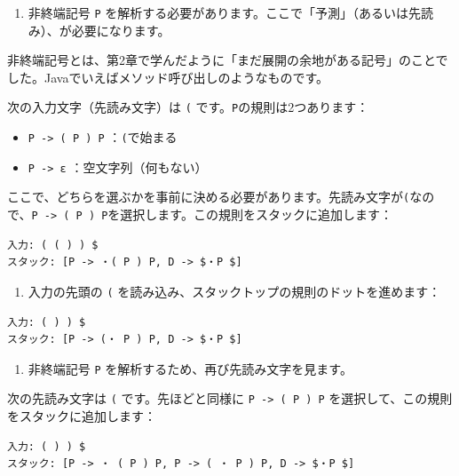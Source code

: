 \begin{enumerate}
\def\labelenumi{\arabic{enumi}.}
\setcounter{enumi}{1}
\tightlist
\item
  非終端記号 \texttt{P}
  を解析する必要があります。ここで「予測」（あるいは先読み）、が必要になります。
\end{enumerate}

非終端記号とは、第2章で学んだように「まだ展開の余地がある記号」のことでした。Javaでいえばメソッド呼び出しのようなものです。

次の入力文字（先読み文字）は \texttt{(}
です。\texttt{P}の規則は2つあります：

\begin{itemize}
\tightlist
\item
  \texttt{P\ -\textgreater{}\ (\ P\ )\ P} ：\texttt{(}で始まる
\item
  \texttt{P\ -\textgreater{}\ ε} ：空文字列（何もない）
\end{itemize}

ここで、どちらを選ぶかを事前に決める必要があります。先読み文字が\texttt{(}なので、\texttt{P\ -\textgreater{}\ (\ P\ )\ P}を選択します。この規則をスタックに追加します：

\begin{verbatim}
入力: ( ( ) ) $
スタック: [P -> ・( P ) P, D -> $・P $]
\end{verbatim}

\begin{enumerate}
\def\labelenumi{\arabic{enumi}.}
\setcounter{enumi}{2}
\tightlist
\item
  入力の先頭の \texttt{(}
  を読み込み、スタックトップの規則のドットを進めます：
\end{enumerate}

\begin{verbatim}
入力: ( ) ) $
スタック: [P -> (・ P ) P, D -> $・P $]
\end{verbatim}

\begin{enumerate}
\def\labelenumi{\arabic{enumi}.}
\setcounter{enumi}{3}
\tightlist
\item
  非終端記号 \texttt{P} を解析するため、再び先読み文字を見ます。
\end{enumerate}

次の先読み文字は \texttt{(} です。先ほどと同様に
\texttt{P\ -\textgreater{}\ (\ P\ )\ P}
を選択して、この規則をスタックに追加します：

\begin{verbatim}
入力: ( ) ) $
スタック: [P -> ・ ( P ) P, P -> ( ・ P ) P, D -> $・P $]
\end{verbatim}

